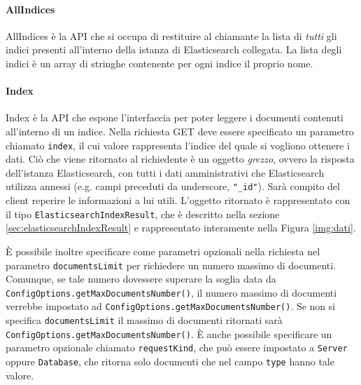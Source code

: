 \paragraph{AllIndices} \Spazio
AllIndices è la API che si occupa di restituire al chiamante la lista di \emph{tutti} gli indici presenti all'interno della istanza di Elasticsearch collegata. La lista degli indici è un array di stringhe contenente per ogni indice il proprio nome.

\paragraph{Index} \Spazio
Index è la API che espone l'interfaccia per poter leggere i documenti contenuti all'interno di un indice. Nella richiesta GET deve essere specificato un parametro chiamato \texttt{index}, il cui valore rappresenta l'indice del quale si vogliono ottenere i dati. Ciò che viene ritornato al richiedente è un oggetto \emph{grezzo}, ovvero la risposta dell'istanza Elasticsearch, con tutti i dati amministrativi che Elasticsearch utilizza annessi (e.g. campi preceduti da underscore, \texttt{"\_id"}). Sarà compito del client reperire le informazioni a lui utili. L'oggetto ritornato è rappresentato con il tipo \texttt{ElasticsearchIndexResult}, che è descritto nella sezione \ref{sec:elasticsearchIndexResult} e rappresentato interamente nella Figura \ref{img:dati}.

È possibile inoltre specificare come parametri opzionali nella richiesta nel parametro \texttt{documentsLimit} per richiedere un numero massimo di documenti. Comunque, se tale numero dovessere superare la soglia data da \texttt{ConfigOptions.getMaxDocumentsNumber()}, il numero massimo di documenti verrebbe impostato ad \texttt{ConfigOptions.getMaxDocumentsNumber()}. Se non si specifica \texttt{documentsLimit} il massimo di documenti ritornati sarà \texttt{ConfigOptions.getMaxDocumentsNumber()}.
È anche possibile specificare un parametro opzionale chiamato \texttt{requestKind}, che può essere impostato a \texttt{Server} oppure \texttt{Database}, che ritorna solo documenti che nel campo \texttt{type} hanno tale valore. 
